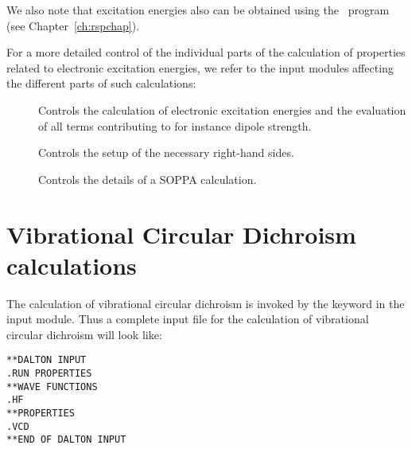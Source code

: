 We also note that excitation energies also can be obtained using the
\resp\ program (see Chapter~\ref{ch:rspchap}).

For a more detailed control of the individual parts of the
calculation of properties related to electronic excitation energies,
we refer to the input modules affecting the different parts of such
calculations:

\begin{description}
\item[] Controls the calculation of electronic excitation
energies and the evaluation of all terms contributing to for instance
dipole strength.

\item[] Controls the setup of the necessary right-hand
sides.

\item[] Controls the details of a SOPPA calculation.

\end{description}



\section{Vibrational Circular Dichroism calculations}

\begin{center}
\end{center}

The calculation of vibrational circular
dichroism is invoked
by the
keyword  in the  input module. Thus a complete
input file for the calculation of vibrational circular dichroism will
look like:

\begin{verbatim}
**DALTON INPUT
.RUN PROPERTIES
**WAVE FUNCTIONS
.HF
**PROPERTIES
.VCD
**END OF DALTON INPUT
\end{verbatim}

